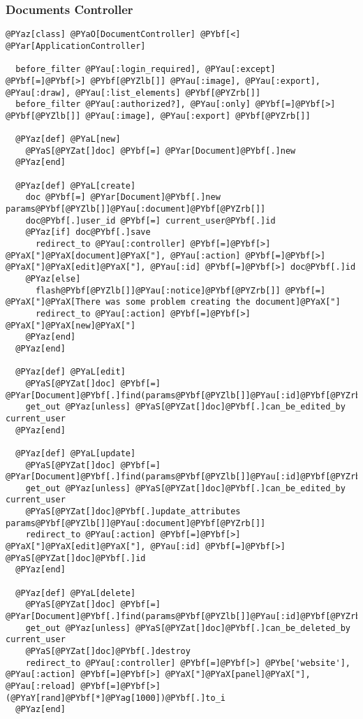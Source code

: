 
\subsubsection{Documents Controller} %
\label{ssub:documents_controller}

\begin{Verbatim}[commandchars=@\[\]]
@PYaz[class] @PYaO[DocumentController] @PYbf[<] @PYar[ApplicationController]

  before_filter @PYau[:login_required], @PYau[:except] @PYbf[=]@PYbf[>] @PYbf[@PYZlb[]] @PYau[:image], @PYau[:export], @PYau[:draw], @PYau[:list_elements] @PYbf[@PYZrb[]]
  before_filter @PYau[:authorized?], @PYau[:only] @PYbf[=]@PYbf[>] @PYbf[@PYZlb[]] @PYau[:image], @PYau[:export] @PYbf[@PYZrb[]]
  
  @PYaz[def] @PYaL[new]
    @PYaS[@PYZat[]doc] @PYbf[=] @PYar[Document]@PYbf[.]new
  @PYaz[end]
  
  @PYaz[def] @PYaL[create]
    doc @PYbf[=] @PYar[Document]@PYbf[.]new params@PYbf[@PYZlb[]]@PYau[:document]@PYbf[@PYZrb[]]
    doc@PYbf[.]user_id @PYbf[=] current_user@PYbf[.]id
    @PYaz[if] doc@PYbf[.]save
      redirect_to @PYau[:controller] @PYbf[=]@PYbf[>] @PYaX["]@PYaX[document]@PYaX["], @PYau[:action] @PYbf[=]@PYbf[>] @PYaX["]@PYaX[edit]@PYaX["], @PYau[:id] @PYbf[=]@PYbf[>] doc@PYbf[.]id
    @PYaz[else]
      flash@PYbf[@PYZlb[]]@PYau[:notice]@PYbf[@PYZrb[]] @PYbf[=] @PYaX["]@PYaX[There was some problem creating the document]@PYaX["]
      redirect_to @PYau[:action] @PYbf[=]@PYbf[>] @PYaX["]@PYaX[new]@PYaX["]
    @PYaz[end]
  @PYaz[end]
  
  @PYaz[def] @PYaL[edit]
    @PYaS[@PYZat[]doc] @PYbf[=] @PYar[Document]@PYbf[.]find(params@PYbf[@PYZlb[]]@PYau[:id]@PYbf[@PYZrb[]])
    get_out @PYaz[unless] @PYaS[@PYZat[]doc]@PYbf[.]can_be_edited_by current_user
  @PYaz[end]
  
  @PYaz[def] @PYaL[update]
    @PYaS[@PYZat[]doc] @PYbf[=] @PYar[Document]@PYbf[.]find(params@PYbf[@PYZlb[]]@PYau[:id]@PYbf[@PYZrb[]])
    get_out @PYaz[unless] @PYaS[@PYZat[]doc]@PYbf[.]can_be_edited_by current_user
    @PYaS[@PYZat[]doc]@PYbf[.]update_attributes params@PYbf[@PYZlb[]]@PYau[:document]@PYbf[@PYZrb[]]
    redirect_to @PYau[:action] @PYbf[=]@PYbf[>] @PYaX["]@PYaX[edit]@PYaX["], @PYau[:id] @PYbf[=]@PYbf[>] @PYaS[@PYZat[]doc]@PYbf[.]id
  @PYaz[end]
  
  @PYaz[def] @PYaL[delete]
    @PYaS[@PYZat[]doc] @PYbf[=] @PYar[Document]@PYbf[.]find(params@PYbf[@PYZlb[]]@PYau[:id]@PYbf[@PYZrb[]])
    get_out @PYaz[unless] @PYaS[@PYZat[]doc]@PYbf[.]can_be_deleted_by current_user
    @PYaS[@PYZat[]doc]@PYbf[.]destroy
    redirect_to @PYau[:controller] @PYbf[=]@PYbf[>] @PYbe['website'], @PYau[:action] @PYbf[=]@PYbf[>] @PYaX["]@PYaX[panel]@PYaX["], @PYau[:reload] @PYbf[=]@PYbf[>] (@PYaY[rand]@PYbf[*]@PYag[1000])@PYbf[.]to_i
  @PYaz[end]
  

\end{Verbatim}
